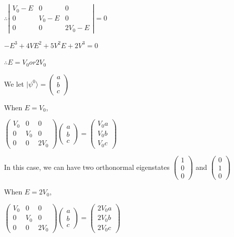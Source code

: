 \documentclass[12pt]{article}
\begin{document}
\begin{spacing}{2.0}
$\therefore \left|
\begin{array}{ccc}
V_0-E & 0 & 0 \\
0 & V_0-E & 0 \\
0 & 0 & 2V_0-E
\end{array}
\right|=0$

$-E^3+4VE^2+5V^2E+2V^3=0$

$\therefore E=V_0 or 2V_0$

We let $|\psi^0\rangle =
\left(
\begin{array}{c}
a \\
b \\
c
\end{array}
\right)$

When $E=V_0$,

$\left(
\begin{array}{ccc}
V_0 & 0 & 0 \\
0 & V_0 & 0 \\
0 & 0 & 2V_0
\end{array}
\right)
\left(
\begin{array}{c}
a \\
b \\
c
\end{array}
\right)=
\left(
\begin{array}{c}
V_0a \\
V_0b \\
V_0c
\end{array}
\right)$

In this case, we can have two orthonormal eigenstates $\left(
\begin{array}{c}
1 \\
0 \\
0
\end{array}
\right)$ and $\left(
\begin{array}{c}
0 \\
1 \\
0
\end{array}
\right)$

When $E=2V_0$,

$\left(
\begin{array}{ccc}
V_0 & 0 & 0 \\
0 & V_0 & 0 \\
0 & 0 & 2V_0
\end{array}
\right)
\left(
\begin{array}{c}
a \\
b \\
c
\end{array}
\right)=
\left(
\begin{array}{c}
2V_0a \\
2V_0b \\
2V_0c
\end{array}
\right)$


\end{spacing}
\end{document}
